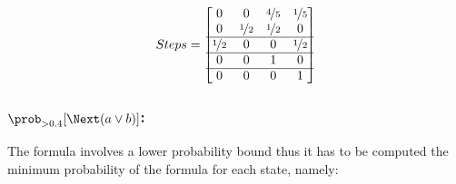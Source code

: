 \subsection{}

\[
	Steps =
	\begin{bmatrix}
		0               & 0               & \nicefrac{4}{5} & \nicefrac{1}{5} \\
		0               & \nicefrac{1}{2} & \nicefrac{1}{2} & 0               \\
		\hline
		\nicefrac{1}{2} & 0               & 0               & \nicefrac{1}{2} \\
		\hline
		0               & 0               & 1               & 0               \\
		\hline
		0               & 0               & 0               & 1
	\end{bmatrix}
\]

\subsubsection{}

\subsubsection*{$\prob_{>0.4} [\Next (a \vee b)]$:}

The formula involves a lower probability bound thus it has to be computed the
minimum probability of the formula for each state, namely:


